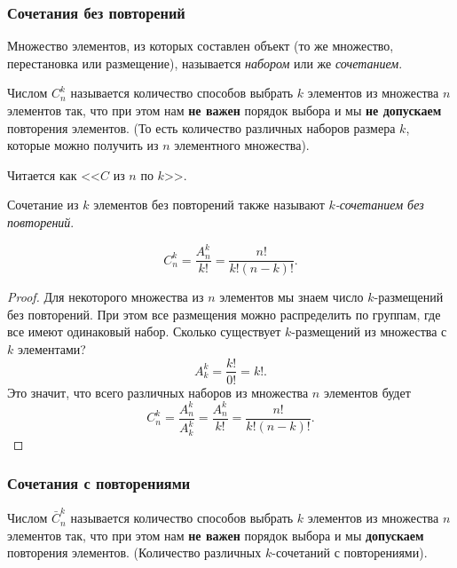 \subsubsection*{Сочетания без повторений}

\begin{definition}
	Множество элементов, из которых составлен объект (то же множество, перестановка или размещение), называется \textit{набором} или же \textit{сочетанием}.
\end{definition}

\begin{definition}
	Числом $C_n^k$ называется количество способов выбрать $k$ элементов из множества $n$ элементов так, что при этом нам \textbf{не важен} порядок выбора и мы \textbf{не допускаем} повторения элементов. (То есть количество различных наборов размера $k$, которые можно получить из $n$ элементного множества).
\end{definition}

\begin{note}
	Читается как <<$C$ из $n$ по $k$>>.
\end{note}

\begin{note}
	Сочетание из $k$ элементов без повторений также называют \textit{$k$-сочетанием без повторений}.
\end{note}

\begin{theorem}
	\[
		C_n^k = \frac{A_n^k}{k!} = \frac{n!}{k! (n - k)!}.
	\]
\end{theorem}

\begin{proof}
	Для некоторого множества из $n$ элементов мы знаем число $k$-размещений без повторений. При этом все размещения можно распределить по группам, где все имеют одинаковый набор. Сколько существует $k$-размещений из множества с $k$ элементами?
	\[
		A_k^k = \frac{k!}{0!} = k!.
	\]
	Это значит, что всего различных наборов из множества $n$ элементов будет
	\[
		C_n^k = \frac{A_n^k}{A_k^k} = \frac{A_n^k}{k!} = \frac{n!}{k! (n - k)!}.
	\]
\end{proof}

\subsubsection*{Сочетания с повторениями}

\begin{definition}
	Числом $\bar{C}_n^k$ называется количество способов выбрать $k$ элементов из множества $n$ элементов так, что при этом нам \textbf{не важен} порядок выбора и мы \textbf{допускаем} повторения элементов. (Количество различных $k$-сочетаний с повторениями).
\end{definition}

